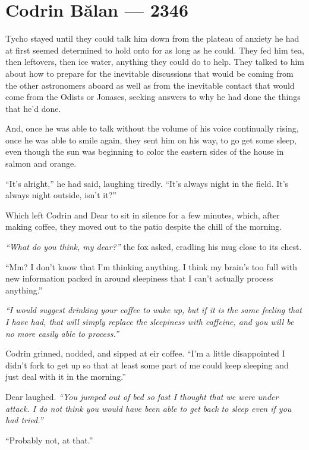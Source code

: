 \hypertarget{codrin-bux103lan-2346}{%
\chapter{Codrin Bălan — 2346}\label{codrin-bux103lan-2346}}

Tycho stayed until they could talk him down from the plateau of anxiety he had at first seemed determined to hold onto for as long as he could. They fed him tea, then leftovers, then ice water, anything they could do to help. They talked to him about how to prepare for the inevitable discussions that would be coming from the other astronomers aboard as well as from the inevitable contact that would come from the Odists or Jonases, seeking answers to why he had done the things that he'd done.

And, once he was able to talk without the volume of his voice continually rising, once he was able to smile again, they sent him on his way, to go get some sleep, even though the sun was beginning to color the eastern sides of the house in salmon and orange.

``It's alright,'' he had said, laughing tiredly. ``It's always night in the field. It's always night outside, isn't it?''

Which left Codrin and Dear to sit in silence for a few minutes, which, after making coffee, they moved out to the patio despite the chill of the morning.

\emph{``What do you think, my dear?''} the fox asked, cradling his mug close to its chest.

``Mm? I don't know that I'm thinking anything. I think my brain's too full with new information packed in around sleepiness that I can't actually process anything.''

\emph{``I would suggest drinking your coffee to wake up, but if it is the same feeling that I have had, that will simply replace the sleepiness with caffeine, and you will be no more easily able to process.''}

Codrin grinned, nodded, and sipped at eir coffee. ``I'm a little disappointed I didn't fork to get up so that at least some part of me could keep sleeping and just deal with it in the morning.''

Dear laughed. \emph{``You jumped out of bed so fast I thought that we were under attack. I do not think you would have been able to get back to sleep even if you had tried.''}

``Probably not, at that.''

